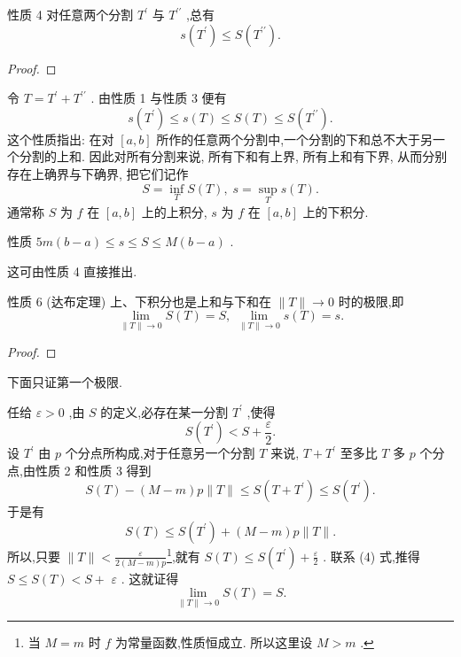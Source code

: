 性质 4 对任意两个分割 \({T}^{\prime }\) 与 \({T}^{\prime \prime }\) ,总有
\[
s\left( {T}^{\prime }\right)  \leq  S\left( {T}^{\prime \prime }\right) .
\]
\begin{proof}

\end{proof}
令 \(T = {T}^{\prime } + {T}^{\prime \prime }\) . 由性质 1 与性质 3 便有
\[
s\left( {T}^{\prime }\right)  \leq  s\left( T\right)  \leq  S\left( T\right)  \leq  S\left( {T}^{\prime \prime }\right) .
\]
这个性质指出: 在对 \(\left\lbrack  {a,b}\right\rbrack\) 所作的任意两个分割中,一个分割的下和总不大于另一个分割的上和. 因此对所有分割来说, 所有下和有上界, 所有上和有下界, 从而分别存在上确界与下确界, 把它们记作
\[
S = \mathop{\inf }\limits_{T}S\left( T\right) ,\;s = \mathop{\sup }\limits_{T}s\left( T\right) .
\]
通常称 \(S\) 为 \(f\) 在 \(\left\lbrack  {a,b}\right\rbrack\) 上的上积分, \(s\) 为 \(f\) 在 \(\left\lbrack  {a,b}\right\rbrack\) 上的下积分.

性质 \({5m}\left( {b - a}\right)  \leq  s \leq  S \leq  M\left( {b - a}\right)\) .

这可由性质 4 直接推出.

性质 6 (达布定理) 上、下积分也是上和与下和在 \(\parallel T\parallel  \rightarrow  0\) 时的极限,即
\[
\mathop{\lim }\limits_{{\parallel T\parallel  \rightarrow  0}}S\left( T\right)  = S,\;\mathop{\lim }\limits_{{\parallel T\parallel  \rightarrow  0}}s\left( T\right)  = s.
\]
\begin{proof}

\end{proof}
下面只证第一个极限.

任给 \(\varepsilon  > 0\) ,由 \(S\) 的定义,必存在某一分割 \({T}^{\prime }\) ,使得
\[
S\left( {T}^{\prime }\right)  < S + \frac{\varepsilon }{2}. \tag{4}
\]
设 \({T}^{\prime }\) 由 \(p\) 个分点所构成,对于任意另一个分割 \(T\) 来说, \(T + {T}^{\prime }\) 至多比 \(T\) 多 \(p\) 个分点,由性质 2 和性质 3 得到
\[
S\left( T\right)  - \left( {M - m}\right) p\parallel T\parallel  \leq  S\left( {T + {T}^{\prime }}\right)  \leq  S\left( {T}^{\prime }\right) .
\]
于是有
\[
S\left( T\right)  \leq  S\left( {T}^{\prime }\right)  + \left( {M - m}\right) p\parallel T\parallel .
\]
所以,只要 \(\parallel T\parallel  < \frac{\varepsilon }{2\left( {M - m}\right) p}\)\footnote{当 \(M = m\) 时 \(f\) 为常量函数,性质恒成立. 所以这里设 \(M > m\) .},就有 \(S\left( T\right)  \leq  S\left( {T}^{\prime }\right)  + \frac{\varepsilon }{2}\) . 联系 (4) 式,推得 \(S \leq  S\left( T\right)  < S +\)  \(\varepsilon\) . 这就证得
\[
\mathop{\lim }\limits_{{\parallel T\parallel  \rightarrow  0}}S\left( T\right)  = S.
\]
